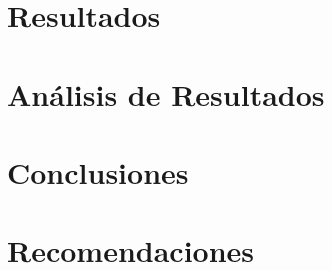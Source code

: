 \documentclass[10pt, letterpaper]{report}
\newcommand{\defaultparformat}[1]{
	{\setlength{\parskip}{2ex}
    }
}
\begin{document}
\newpage
\ifdefined\parpordefecto
	\defaultparformat{capitulos}
\else
	
\fi


\newpage
\thispagestyle{empty}
\mbox{}
\newpage 

\ifdefined\CAPresultados
	\newpage
	\chapter{Resultados}
	\ifdefined\parpordefecto
		\defaultparformat{resultados}
	\else
		
	\fi
\fi


\newpage
\thispagestyle{empty}
\mbox{}
\newpage  

\ifdefined\CAPdiscusion
	\newpage
	\chapter{Análisis de Resultados}
	\ifdefined\parpordefecto
		\defaultparformat{discusion}
	\else
		
	\fi
\fi


\newpage
\thispagestyle{empty}
\mbox{}
\newpage  

\ifdefined\CAPconclusiones
	\newpage
	\chapter{Conclusiones}
	\ifdefined\parpordefecto
		\defaultparformat{conclusiones}
	\else
		
	\fi
\fi

\newpage
\thispagestyle{empty}
\mbox{}
\newpage  

\ifdefined\CAPrecomendaciones
	\newpage
	\chapter{Recomendaciones}
	\ifdefined\parpordefecto
		\defaultparformat{recomendaciones}
	\else
		
	\fi
\fi


\newpage
\thispagestyle{empty}
\mbox{}
\newpage  
\end{document}
